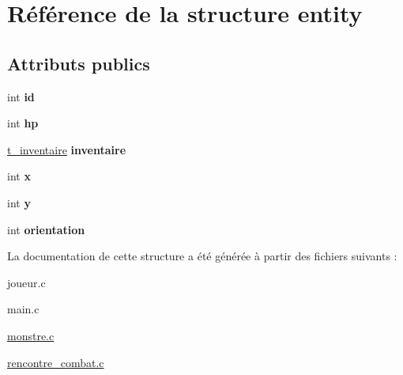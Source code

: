 \hypertarget{structentity}{\section{Référence de la structure entity}
\label{structentity}
}
\subsection*{Attributs publics}
\begin{DoxyCompactItemize}
\item 
\hypertarget{structentity_a71021ba5e5b93ef5f9e7c96159f1b6e5}{int {\bfseries id}}\label{structentity_a71021ba5e5b93ef5f9e7c96159f1b6e5}

\item 
\hypertarget{structentity_ac34cbe0ddb5aedb70ed2e57fc6c17e7b}{int {\bfseries hp}}\label{structentity_ac34cbe0ddb5aedb70ed2e57fc6c17e7b}

\item 
\hypertarget{structentity_a91f02db9a651c9436e2ed4999a178a2c}{\hyperlink{structt__inventaire}{t\-\_\-inventaire} {\bfseries inventaire}}\label{structentity_a91f02db9a651c9436e2ed4999a178a2c}

\item 
\hypertarget{structentity_a3788b4bbb5793944804ce16aee855245}{int {\bfseries x}}\label{structentity_a3788b4bbb5793944804ce16aee855245}

\item 
\hypertarget{structentity_a9bf766bb971a7b690035c974a9b0c4b8}{int {\bfseries y}}\label{structentity_a9bf766bb971a7b690035c974a9b0c4b8}

\item 
\hypertarget{structentity_a903024a6a213472518cc46d691332ba9}{int {\bfseries orientation}}\label{structentity_a903024a6a213472518cc46d691332ba9}

\end{DoxyCompactItemize}


La documentation de cette structure a été générée à partir des fichiers suivants \-:\begin{DoxyCompactItemize}
\item 
joueur.\-c\item 
main.\-c\item 
\hyperlink{monstre_8c}{monstre.\-c}\item 
\hyperlink{rencontre__combat_8c}{rencontre\-\_\-combat.\-c}\end{DoxyCompactItemize}
